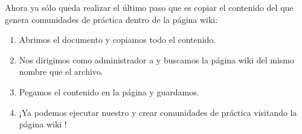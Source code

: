 Ahora ya sólo queda realizar el último paso que es copiar el contenido del \profile{} que genera comunidades de práctica dentro de la página wiki:

\begin{enumerate}
\item Abrimos el documento  y copiamos todo el contenido.
\item Nos dirigimos como administrador a  y buscamos la página wiki del mismo nombre que el archivo.
\item Pegamos el contenido en la página y guardamos.
\item ¡Ya podemos ejecutar nuestro \profile{} y crear comunidades de práctica visitando la página wiki !
\end{enumerate}